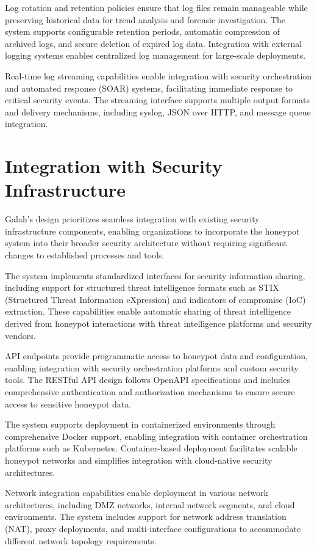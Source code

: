 Log rotation and retention policies ensure that log files remain manageable while preserving historical data for trend analysis and forensic investigation. The system supports configurable retention periods, automatic compression of archived logs, and secure deletion of expired log data. Integration with external logging systems enables centralized log management for large-scale deployments.

Real-time log streaming capabilities enable integration with security orchestration and automated response (SOAR) systems, facilitating immediate response to critical security events. The streaming interface supports multiple output formats and delivery mechanisms, including syslog, JSON over HTTP, and message queue integration.

\section{Integration with Security Infrastructure}

Galah's design prioritizes seamless integration with existing security infrastructure components, enabling organizations to incorporate the honeypot system into their broader security architecture without requiring significant changes to established processes and tools.

The system implements standardized interfaces for security information sharing, including support for structured threat intelligence formats such as STIX (Structured Threat Information eXpression) and indicators of compromise (IoC) extraction. These capabilities enable automatic sharing of threat intelligence derived from honeypot interactions with threat intelligence platforms and security vendors.

API endpoints provide programmatic access to honeypot data and configuration, enabling integration with security orchestration platforms and custom security tools. The RESTful API design follows OpenAPI specifications and includes comprehensive authentication and authorization mechanisms to ensure secure access to sensitive honeypot data.

The system supports deployment in containerized environments through comprehensive Docker support, enabling integration with container orchestration platforms such as Kubernetes. Container-based deployment facilitates scalable honeypot networks and simplifies integration with cloud-native security architectures.

Network integration capabilities enable deployment in various network architectures, including DMZ networks, internal network segments, and cloud environments. The system includes support for network address translation (NAT), proxy deployments, and multi-interface configurations to accommodate different network topology requirements.

